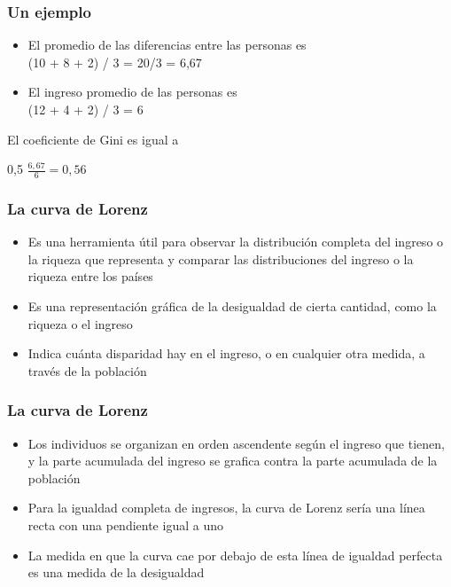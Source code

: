 \documentclass{beamer}
\begin{document}
\begin{frame} 
\frametitle{Un ejemplo}
\begin{itemize}
    \item El promedio de las diferencias entre las personas es \\ (10 + 8 + 2) / 3 = 20/3 = 6,67 \\ \vspace{3mm}
    \item El ingreso promedio de las personas es \\ (12 + 4 + 2) / 3 = 6
\end{itemize}
\vspace{3mm}

El coeficiente de Gini es igual a 
\begin{center}
    0,5 $ \frac{6,67}{6} = 0,56$
\end{center}
\end{frame}

\begin{frame} 
\frametitle{La curva de Lorenz}
\begin{itemize}
\item Es una herramienta útil para observar la distribución completa del ingreso o la riqueza que representa y comparar las distribuciones del ingreso o la riqueza entre los países
\item Es una representación gráfica de la desigualdad de cierta cantidad, como la riqueza o el ingreso
\item Indica cuánta disparidad hay en el ingreso, o en cualquier otra medida, a través de la población
\end{itemize}
\end{frame}

\begin{frame} 
\frametitle{La curva de Lorenz}
\begin{itemize}
\item Los individuos se organizan en orden ascendente según el ingreso que tienen, y la parte acumulada del ingreso se grafica contra la parte acumulada de la población
\item Para la igualdad completa de ingresos, la curva de Lorenz sería una línea recta con una pendiente igual a uno
\item La medida en que la curva cae por debajo de esta línea de igualdad perfecta es una medida de la desigualdad
\end{itemize}
\end{frame}
\end{document}
